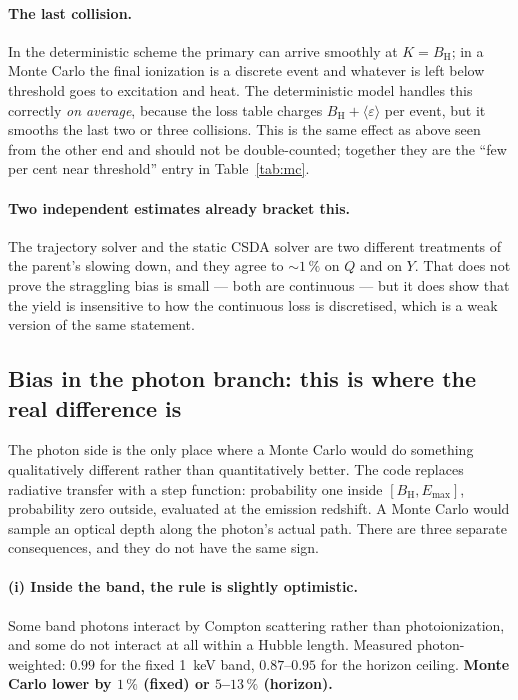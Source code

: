 \documentclass[11pt,a4paper]{article}
\newcommand{\eps}{\varepsilon}
\newcommand{\BH}{B_{\mathrm{H}}}
\begin{document}
\paragraph{The last collision.}  In the deterministic scheme the primary can
arrive smoothly at $K=\BH$; in a Monte Carlo the final ionization is a discrete
event and whatever is left below threshold goes to excitation and heat.  The
deterministic model handles this correctly \emph{on average}, because the loss
table charges $\BH+\langle\eps\rangle$ per event, but it smooths the last two
or three collisions.  This is the same effect as above seen from the other end
and should not be double-counted; together they are the ``few per cent near
threshold'' entry in Table~\ref{tab:mc}.

\paragraph{Two independent estimates already bracket this.}  The trajectory
solver and the static CSDA solver are two different treatments of the parent's
slowing down, and they agree to $\sim1\,\%$ on $Q$ and on $Y$.  That does not
prove the straggling bias is small --- both are continuous --- but it does show
that the yield is insensitive to how the continuous loss is discretised, which
is a weak version of the same statement.

\subsection{Bias in the photon branch: this is where the real difference is}

The photon side is the only place where a Monte Carlo would do something
qualitatively different rather than quantitatively better.  The code replaces
radiative transfer with a step function: probability one inside
$[\BH, E_{\max}]$, probability zero outside, evaluated at the emission
redshift.  A Monte Carlo would sample an optical depth along the photon's
actual path.  There are three separate consequences, and they do not have the
same sign.

\paragraph{(i) Inside the band, the rule is slightly optimistic.}  Some band
photons interact by Compton scattering rather than photoionization, and some do
not interact at all within a Hubble length.  Measured photon-weighted:
$0.99$ for the fixed 1~keV band, $0.87$--$0.95$ for the horizon ceiling.
\textbf{Monte Carlo lower by $1\,\%$ (fixed) or $5$--$13\,\%$ (horizon).}
\end{document}
